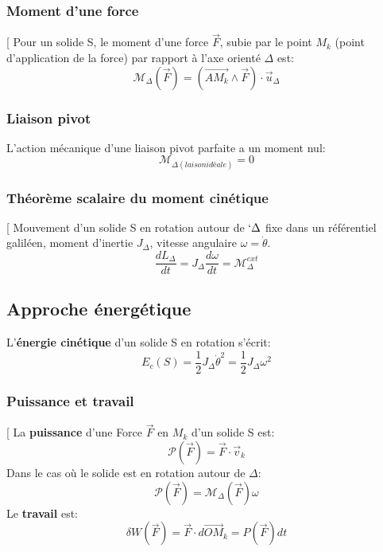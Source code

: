 \documentclass[12pt,hidelinks]{article}
\begin{document}
        \subsubsection{Moment d'une force}
            \begin{DashedDefinition}{}[
                Pour un solide S, le moment d'une force $\vec F$, subie par le point $M_k$ (point d'application de la force) par rapport à l'axe orienté $\Delta$ est:
                \[\mathcal{M}_\Delta(\vec F)=(\overrightarrow{AM_k} \wedge \vec F) \cdot \vec u_\Delta\]
            \end{DashedDefinition}
        \subsubsection{Liaison pivot}
            L'action mécanique d'une liaison pivot parfaite a un moment nul:
            \[\mathcal{M}_{\Delta (laison idéale)}=0\]
        \subsubsection{Théorème scalaire du moment cinétique}
            \begin{DashedDefinition}{}[
                Mouvement d'un solide S en rotation autour de $`\Delta$ fixe dans un référentiel galiléen, moment d'inertie $J_\Delta$, vitesse angulaire $\omega = \dot{\theta}.$
                \[\frac{dL_\Delta}{dt} = J_\Delta \frac{d \omega}{dt} = \mathcal{M}_\Delta^{ext}\]
            \end{DashedDefinition}
    \subsection{Approche énergétique}
        L'\textbf{énergie cinétique} d'un solide S en rotation s'écrit:
        \[E_c(S)=\frac{1}{2} J_\Delta \dot{\theta}^2 = \frac{1}{2} J_\Delta \omega^2\]
        \subsubsection{Puissance et travail}
        \begin{DashedDefinition}{}[
            La \textbf{puissance} d'une Force $\vec F$ en $M_k$ d'un solide S est:
            \[\mathcal{P}(\vec F)=\vec F \cdot \vec v_k\]
            Dans le cas où le solide est en rotation autour de $\Delta$:
            \[\mathcal{P}(\vec F)=\mathcal{M}_\Delta(\vec F)\omega\]
            Le \textbf{travail} est:
            \[\delta W(\vec F)= \vec F \cdot d \overrightarrow{OM}_k = P(\vec F)dt\]
        \end{DashedDefinition}
\end{document}
